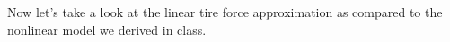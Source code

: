 
Now let's take a look at the linear tire force approximation as compared to the nonlinear model we derived in class.

\vspace*{0.5cm}
